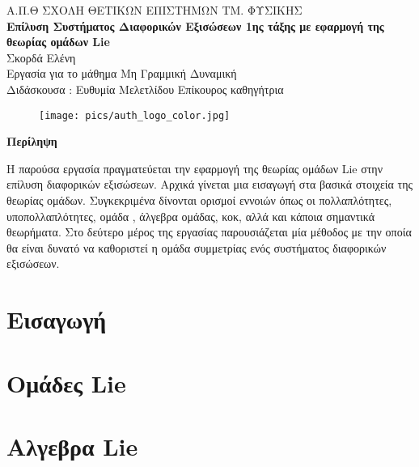 \documentclass[12pt]{article}
\renewenvironment{abstract}[1][1.0]
{
	\begin{center}
		{\bf Περίληψη}\\[12pt]
		\begin{minipage}{#1\textwidth}
}
{
		\end{minipage}
	\end{center}
}
\begin{document}
	\begin{titlepage}
		\begin{center}
		\large{{\sc Α.Π.Θ} ΣΧΟΛΗ ΘΕΤΙΚΩΝ ΕΠΙΣΤΗΜΩΝ ΤΜ. ΦΥΣΙΚΗΣ}\\[0.5cm]
		\vspace{1cm}
		\LARGE\textbf{Επίλυση Συστήματος Διαφορικών Εξισώσεων 1ης τάξης με εφαρμογή της θεωρίας ομάδων \textlatin{Lie} }\\[1.0cm] 
		
		\large{Σκορδά Ελένη}\\[0.2cm]
		
		\vspace{1cm}
		\small{Εργασία για το μάθημα Μη Γραμμική Δυναμική}\\[0.1cm] 
		\small{Διδάσκουσα : Ευθυμία Μελετλίδου Επίκουρος καθηγήτρια }\\[0.2cm]
		
		\begin{figure}[H]\centering
		\texttt{[image: pics/auth\_logo\_color.jpg]}
		\end{figure}
		\end{center}
		
		\begin{abstract}
		         Η παρούσα εργασία πραγματεύεται την εφαρμογή της θεωρίας ομάδων \textlatin{Lie} στην επίλυση διαφορικών εξισώσεων. Αρχικά γίνεται μια εισαγωγή στα βασικά στοιχεία της θεωρίας ομάδων. Συγκεκριμένα δίνονται ορισμοί εννοιών όπως οι πολλαπλότητες, υποπολλαπλότητες, ομάδα , άλγεβρα ομάδας, κοκ, αλλά και κάποια σημαντικά θεωρήματα. Στο δεύτερο μέρος της εργασίας παρουσιάζεται μία μέθοδος με την οποία θα είναι δυνατό να καθοριστεί η ομάδα συμμετρίας ενός συστήματος διαφορικών εξισώσεων. 
		\end{abstract}
		\vfill
		
	\end{titlepage}
	
	\newpage
	\tableofcontents
	\newpage
	\section{Εισαγωγή}
	
	
	\nocite{topologysame}
	\nocite{coordinateCharts}
	\nocite{manifold}
	\nocite{olver2000applications}
	\section{Ομάδες \textlatin{Lie}}
	\section{Αλγεβρα \textlatin{Lie} }
	
	\newpage
	
	
\end{document}
